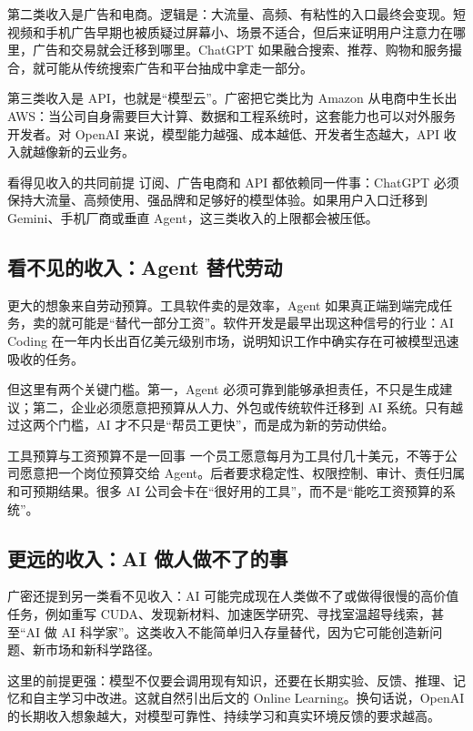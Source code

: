\documentclass[a4paper]{article}
\begin{document}
第二类收入是广告和电商。逻辑是：大流量、高频、有粘性的入口最终会变现。短视频和手机广告早期也被质疑过屏幕小、场景不适合，但后来证明用户注意力在哪里，广告和交易就会迁移到哪里。ChatGPT 如果融合搜索、推荐、购物和服务撮合，就可能从传统搜索广告和平台抽成中拿走一部分。

第三类收入是 API，也就是“模型云”。广密把它类比为 Amazon 从电商中生长出 AWS：当公司自身需要巨大计算、数据和工程系统时，这套能力也可以对外服务开发者。对 OpenAI 来说，模型能力越强、成本越低、开发者生态越大，API 收入就越像新的云业务。

\begin{importantbox}{看得见收入的共同前提}
订阅、广告电商和 API 都依赖同一件事：ChatGPT 必须保持大流量、高频使用、强品牌和足够好的模型体验。如果用户入口迁移到 Gemini、手机厂商或垂直 Agent，这三类收入的上限都会被压低。
\end{importantbox}

\subsection{看不见的收入：Agent 替代劳动}

更大的想象来自劳动预算。工具软件卖的是效率，Agent 如果真正端到端完成任务，卖的就可能是“替代一部分工资”。软件开发是最早出现这种信号的行业：AI Coding 在一年内长出百亿美元级别市场，说明知识工作中确实存在可被模型迅速吸收的任务。

但这里有两个关键门槛。第一，Agent 必须可靠到能够承担责任，不只是生成建议；第二，企业必须愿意把预算从人力、外包或传统软件迁移到 AI 系统。只有越过这两个门槛，AI 才不只是“帮员工更快”，而是成为新的劳动供给。

\begin{warningbox}{工具预算与工资预算不是一回事}
一个员工愿意每月为工具付几十美元，不等于公司愿意把一个岗位预算交给 Agent。后者要求稳定性、权限控制、审计、责任归属和可预期结果。很多 AI 公司会卡在“很好用的工具”，而不是“能吃工资预算的系统”。
\end{warningbox}

\subsection{更远的收入：AI 做人做不了的事}

广密还提到另一类看不见收入：AI 可能完成现在人类做不了或做得很慢的高价值任务，例如重写 CUDA、发现新材料、加速医学研究、寻找室温超导线索，甚至“AI 做 AI 科学家”。这类收入不能简单归入存量替代，因为它可能创造新问题、新市场和新科学路径。

这里的前提更强：模型不仅要会调用现有知识，还要在长期实验、反馈、推理、记忆和自主学习中改进。这就自然引出后文的 Online Learning。换句话说，OpenAI 的长期收入想象越大，对模型可靠性、持续学习和真实环境反馈的要求越高。
\end{document}
